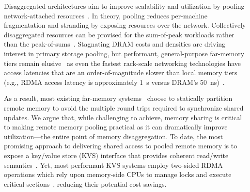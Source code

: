 Disaggregated architectures aim to improve scalability and utilization by
pooling network-attached resources~\cite{dredbox,firebox,blade-server,legoos}.
In theory, pooling reduces per-machine fragmentation and stranding by exposing
resources over the network. Collectively disaggregated resources can be provised
for the sum-of-peak workloads rather than the peak-of-sums~\cite{dsnf,supernic}.
Stagnating DRAM costs and densities are driving interest in primary storage
pooling, but performant, general-purpose far-memory tiers remain
elusive~\cite{fastswap,3po,kona,infiniswap,hydra,leap,legoos,dilos} as even the
fastest rack-scale networking technologies have access latencies that are an
order-of-magnitude slower than local memory tiers
(e.g., RDMA access latency is approximately 1~{\textmu}s versus DRAM's
50~ns)~\cite{clover}.



As a result, most existing far-memory systems~\cite{kona,mira,aifm,trackfm,carbink} choose to statically partition remote memory to avoid the multiple round trips required to 
synchronize shared updates.
We argue that, while challenging to achieve, memory sharing is
critical to making remote memory pooling practical as it can
dramatically improve utilization---the entire point of memory
disaggregation.  To date, the most promising approach to delivering
shared access to pooled remote memory is to expose a key/value store
(KVS) interface that provides coherent read/write
semantics~\cite{rolex,smart,ditto,fusee,clover,sherman,ford}.  Yet,
most performant KVS systems employ two-sided RDMA operations which rely upon
memory-side CPUs to manage locks and execute critical
sections~\cite{memc3,cuckoo-improvements,pilaf,cell}, reducing their
potential cost savings.

